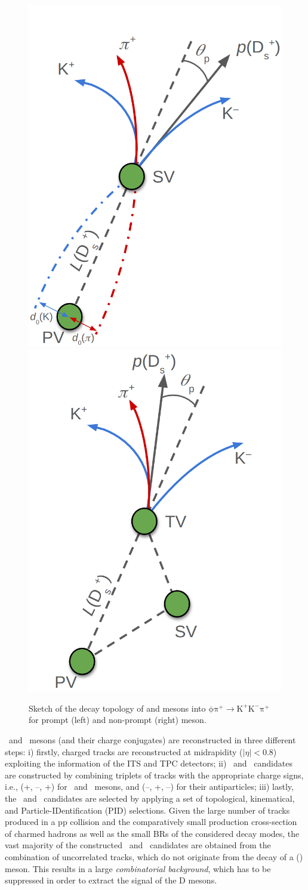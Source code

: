 \begin{figure}[htb]
    \centering
    \includegraphics[width=0.48\linewidth]{Figures/Chapter 4/sketchPrompt.png}
    \includegraphics[width=0.48\linewidth]{Figures/Chapter 4/sketchNonPrompt.png}
    \caption{Sketch of the decay topology of \ds and \dpl mesons into $\mathrm{\phi\pi^+ \rightarrow K^+K^-\pi^+}$ for prompt (left) and non-prompt (right) \ds meson.}
    \label{fig:DecaySketch}
\end{figure}

\ds\ and \dpl\ mesons (and their charge conjugates) are reconstructed in three different steps: i) firstly, charged tracks are reconstructed at midrapidity ($\lvert\eta\rvert < 0.8$) exploiting the information of the ITS and TPC detectors; ii) \ds\ and \dpl\ candidates are constructed by combining triplets of tracks with the appropriate charge signs, i.e., (+, --, +) for \ds\ and \dpl\ mesons, and (--, +, --) for their antiparticles; iii) lastly, the \ds\ and \dpl\ candidates are selected by applying a set of topological, kinematical, and Particle-IDentification (PID) selections. Given the large number of tracks produced in a pp collision and the comparatively small production cross-section of charmed hadrons as well as the small BRs of the considered decay modes, the vast majority of the constructed \ds\ and \dpl\ candidates are obtained from the combination of uncorrelated tracks, which do not originate from the decay of a \ds (\dpl) meson. This results in a large \emph{combinatorial background}, which has to be suppressed in order to extract the signal of the D mesons. 

